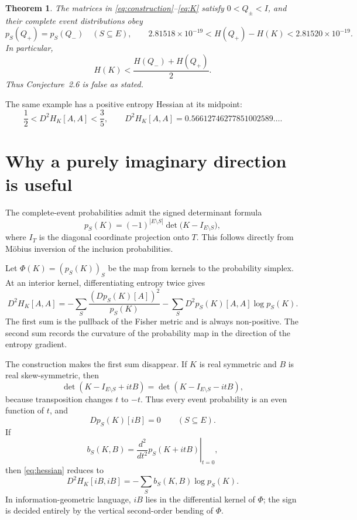 \documentclass[11pt]{article}
\newtheorem{theorem}{Theorem}
\begin{document}
\begin{theorem}\label{thm:main}
The matrices in \eqref{eq:construction}--\eqref{eq:K} satisfy
\(0<Q_\pm<I\), and their complete event distributions obey
\[
 p_S(Q_+)=p_S(Q_-)\quad(S\subseteq E),
 \qquad
 2.81518\times10^{-19}<H(Q_+)-H(K)<2.81520\times10^{-19}.
\]
In particular,
\[
 H(K)<\frac{H(Q_-)+H(Q_+)}2.
\]
Thus Conjecture~2.6 is false as stated.
\end{theorem}

The same example has a positive entropy Hessian at its midpoint:
\[
 \frac12<D^2H_K[A,A]<\frac35,
 \qquad
 D^2H_K[A,A]=0.56612746277851002589\ldots.
\]

\section{Why a purely imaginary direction is useful}

The complete-event probabilities admit the signed determinant formula
\begin{equation}\label{eq:event}
 p_S(K)=(-1)^{|E\setminus S|}
 \det\bigl(K-I_{E\setminus S}\bigr),
\end{equation}
where \(I_T\) is the diagonal coordinate projection onto \(T\).  This follows
directly from M\"obius inversion of the inclusion probabilities.

Let \(\Phi(K)=(p_S(K))_S\) be the map from kernels to the probability simplex.
At an interior kernel, differentiating entropy twice gives
\begin{equation}\label{eq:hessian}
 D^2H_K[A,A]
 =-\sum_S\frac{(Dp_S(K)[A])^2}{p_S(K)}
  -\sum_S D^2p_S(K)[A,A]\log p_S(K).
\end{equation}
The first sum is the pullback of the Fisher metric and is always non-positive.
The second sum records the curvature of the probability map in the direction of
the entropy gradient.

The construction makes the first sum disappear.  If \(K\) is real symmetric
and \(B\) is real skew-symmetric, then
\[
 \det(K-I_{E\setminus S}+itB)
 =\det(K-I_{E\setminus S}-itB),
\]
because transposition changes \(t\) to \(-t\).  Thus every event probability is
an even function of \(t\), and
\begin{equation}\label{eq:vertical}
 Dp_S(K)[iB]=0\qquad(S\subseteq E).
\end{equation}
If
\[
 b_S(K,B)=\left.\frac{d^2}{dt^2}p_S(K+itB)\right|_{t=0},
\]
then \eqref{eq:hessian} reduces to
\begin{equation}\label{eq:reduced}
 D^2H_K[iB,iB]= -\sum_S b_S(K,B)\log p_S(K).
\end{equation}
In information-geometric language, \(iB\) lies in the differential kernel of
\(\Phi\); the sign is decided entirely by the vertical second-order bending of
\(\Phi\).
\end{document}
